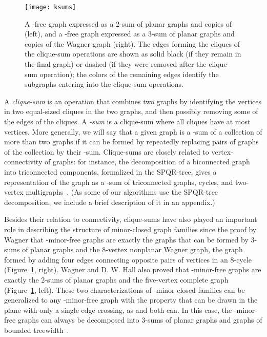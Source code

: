 \documentclass[runningheads]{llncs}
\begin{document}
\begin{figure}[t]
\centering\texttt{[image: ksums]}
\caption{A -free graph expressed as a 2-sum of planar graphs and copies of  (left), and a -free graph expressed as a 3-sum of planar graphs and copies of the Wagner graph (right). The edges forming the cliques of the clique-sum operations are shown as solid black (if they remain in the final graph) or dashed (if they were removed after the clique-sum operation); the colors of the remaining edges identify the subgraphs entering into the clique-sum operations.}
\label{fig:ksums}
\end{figure}

A \emph{clique-sum} is an operation that combines two graphs by identifying the vertices in two equal-sized cliques in the two graphs, and then possibly removing some of the edges of the cliques. A \emph{-sum} is a clique-sum where all cliques have at most  vertices. More generally, we will say that a given graph is a -sum of a collection of more than two graphs if it can be formed by repeatedly replacing pairs of graphs of the collection by their -sum.
Clique-sums are closely related to vertex-connectivity of graphs: for instance, the decomposition of a biconnected graph into triconnected components, formalized in the SPQR-tree, gives a representation of the graph as a -sum of triconnected graphs, cycles, and two-vertex multigraphs~\cite{dt-ipt-89,ht-dgtc-73,m-scpcg-37}. (As some of our algorithms use the SPQR-tree decomposition, we include a brief description of it in an appendix.)

Besides their relation to connectivity, clique-sums have also played an important role in describing the structure of minor-closed graph families since the proof by Wagner \cite{wagnerk5} that -minor-free graphs are exactly the graphs that can be formed by 3-sums of planar graphs and the 8-vertex nonplanar Wagner graph, the graph formed by adding four edges connecting opposite pairs of vertices in an 8-cycle (Figure~\ref{fig:ksums}, right). Wagner \cite{wagnerk33} and D. W. Hall \cite{hall} also proved that -minor-free graphs are exactly the 2-sums of planar graphs and the five-vertex complete graph~ (Figure~\ref{fig:ksums}, left).
These two characterizations of -minor-closed families can be generalized to any -minor-free graph with the property that  can be drawn in the plane with only a single edge crossing, as  and  both can. In this case, the -minor-free graphs can always be decomposed into 3-sums of planar graphs and graphs of bounded treewidth~\cite{rs-onecrossing}.
\end{document}

